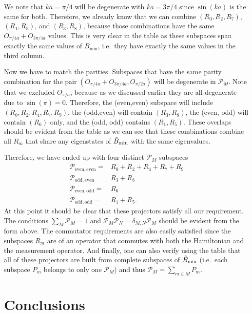 We note that $ka = \pi/4$ will be degenerate with $ka = 3\pi/4$ since
$\sin(ka)$ is the same for both. Therefore, we already know that we
can combine $(R_0, R_2, R_7)$, $(R_1, R_5)$, and $(R_3, R_8)$, because
those combinations have the same $O_{\pi/4a} + O_{3\pi/4a}$
values. This is very clear in the table as these subspaces span
exactly the same values of $B_\mathrm{min}$, i.e.~they have exactly
the same values in the third column.

Now we have to match the parities. Subspaces that have the same parity
combination for the pair $(O_{\pi/4a} + O_{3\pi/4a}, O_{\pi/2a})$ will
be degenerate in $\mathcal{P}_M$. Note that we excluded $O_{\pi/a}$,
because as we discussed earlier they are all degenerate due to
$\sin(\pi) = 0$. Therefore, the (even,even) subspace will include
$(R_0, R_2, R_4, R_7, R_9)$, the (odd,even) will contain $(R_3, R_8)$,
the (even, odd) will contain $(R_6)$ only, and the (odd, odd) contains
$(R_1, R_5)$. These overlaps should be evident from the table as we
can see that these combinations combine all $R_m$ that share any
eigenstates of $\hat{B}_\mathrm{min}$ with the same eigenvalues.

Therefore, we have ended up with four distinct $\mathcal{P}_M$ subspaces
\begin{align}
\mathcal{P}_\mathrm{even,even} = & R_0 + R_2 + R_4 + R_7 + R_9
  \nonumber \\
\mathcal{P}_\mathrm{odd,even} = & R_3 + R_8 \nonumber \\
\mathcal{P}_\mathrm{even,odd} = & R_6 \nonumber \\
\mathcal{P}_\mathrm{odd,odd} = & R_1 + R_5 \nonumber.
\end{align}
At this point it should be clear that these projectors satisfy all our
requirement. The conditions $\sum_M \mathcal{P}_M = 1$ and
$\mathcal{P}_M \mathcal{P}_N = \delta_{M,N} \mathcal{P}_M$ should be
evident from the form above. The commutator requirements are also
easily satisfied since the subspaces $R_m$ are of an operator that
commutes with both the Hamiltonian and the measurement operator. And
finally, one can also verify using the table that all of these
projectors are built from complete subspaces of $\hat{B}_\mathrm{min}$ (i.e.~each
subspace $P_m$ belongs to only one $\mathcal{P}_M$) and thus
$\mathcal{P}_M = \sum_{m \in M} P_m$.

\section{Conclusions}

